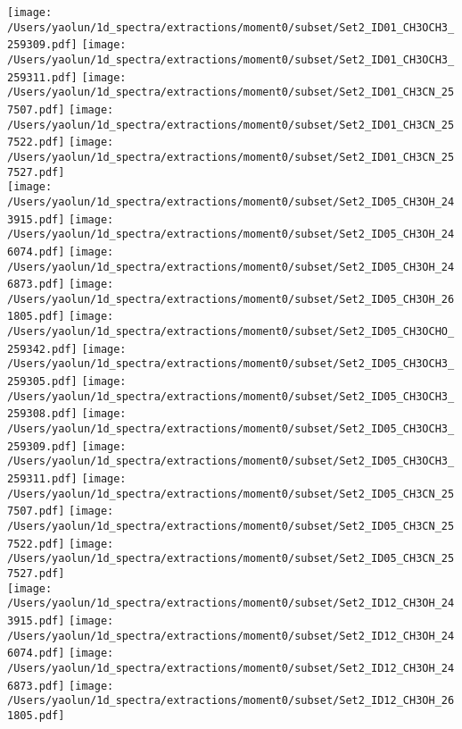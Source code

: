 \begin{figure*}[htbp!]
  \texttt{[image: /Users/yaolun/1d\_spectra/extractions/moment0/subset/Set2\_ID01\_CH3OCH3\_259309.pdf]}
  \texttt{[image: /Users/yaolun/1d\_spectra/extractions/moment0/subset/Set2\_ID01\_CH3OCH3\_259311.pdf]}
  \texttt{[image: /Users/yaolun/1d\_spectra/extractions/moment0/subset/Set2\_ID01\_CH3CN\_257507.pdf]}
  \texttt{[image: /Users/yaolun/1d\_spectra/extractions/moment0/subset/Set2\_ID01\_CH3CN\_257522.pdf]}
  \texttt{[image: /Users/yaolun/1d\_spectra/extractions/moment0/subset/Set2\_ID01\_CH3CN\_257527.pdf]}
  \\
  \texttt{[image: /Users/yaolun/1d\_spectra/extractions/moment0/subset/Set2\_ID05\_CH3OH\_243915.pdf]}
  \texttt{[image: /Users/yaolun/1d\_spectra/extractions/moment0/subset/Set2\_ID05\_CH3OH\_246074.pdf]}
  \texttt{[image: /Users/yaolun/1d\_spectra/extractions/moment0/subset/Set2\_ID05\_CH3OH\_246873.pdf]}
  \texttt{[image: /Users/yaolun/1d\_spectra/extractions/moment0/subset/Set2\_ID05\_CH3OH\_261805.pdf]}
  \texttt{[image: /Users/yaolun/1d\_spectra/extractions/moment0/subset/Set2\_ID05\_CH3OCHO\_259342.pdf]}
  \texttt{[image: /Users/yaolun/1d\_spectra/extractions/moment0/subset/Set2\_ID05\_CH3OCH3\_259305.pdf]}
  \texttt{[image: /Users/yaolun/1d\_spectra/extractions/moment0/subset/Set2\_ID05\_CH3OCH3\_259308.pdf]}
  \texttt{[image: /Users/yaolun/1d\_spectra/extractions/moment0/subset/Set2\_ID05\_CH3OCH3\_259309.pdf]}
  \texttt{[image: /Users/yaolun/1d\_spectra/extractions/moment0/subset/Set2\_ID05\_CH3OCH3\_259311.pdf]}
  \texttt{[image: /Users/yaolun/1d\_spectra/extractions/moment0/subset/Set2\_ID05\_CH3CN\_257507.pdf]}
  \texttt{[image: /Users/yaolun/1d\_spectra/extractions/moment0/subset/Set2\_ID05\_CH3CN\_257522.pdf]}
  \texttt{[image: /Users/yaolun/1d\_spectra/extractions/moment0/subset/Set2\_ID05\_CH3CN\_257527.pdf]}
  \\
  \texttt{[image: /Users/yaolun/1d\_spectra/extractions/moment0/subset/Set2\_ID12\_CH3OH\_243915.pdf]}
  \texttt{[image: /Users/yaolun/1d\_spectra/extractions/moment0/subset/Set2\_ID12\_CH3OH\_246074.pdf]}
  \texttt{[image: /Users/yaolun/1d\_spectra/extractions/moment0/subset/Set2\_ID12\_CH3OH\_246873.pdf]}
  \texttt{[image: /Users/yaolun/1d\_spectra/extractions/moment0/subset/Set2\_ID12\_CH3OH\_261805.pdf]}

\end{figure*}
